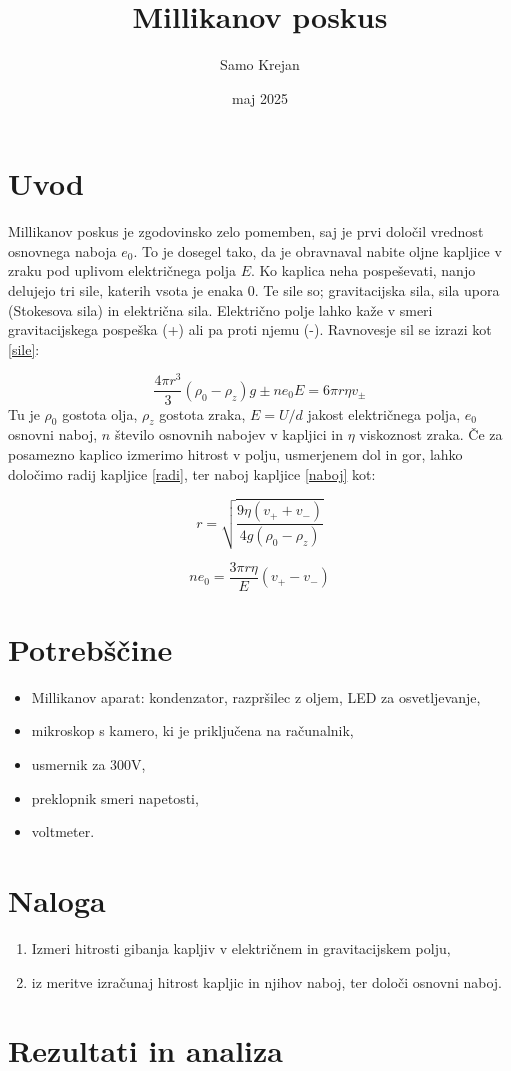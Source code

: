 \documentclass[12pt]{article}
\title{\textbf{Millikanov poskus}}
\author{Samo Krejan}
\date{maj 2025}
\begin{document}
\maketitle

\section{Uvod}

Millikanov poskus je zgodovinsko zelo pomemben, saj je prvi določil vrednost osnovnega naboja $e_0$. To je dosegel tako, da je obravnaval nabite oljne kapljice v zraku pod uplivom električnega polja $E$. Ko kaplica neha pospeševati, nanjo delujejo tri sile, katerih vsota je enaka $0$. Te sile so; gravitacijska sila, sila upora (Stokesova sila) in električna sila. Električno polje lahko kaže v smeri gravitacijskega pospeška (+) ali pa proti njemu (-). Ravnovesje sil se izrazi kot \ref{sile}:

\begin{equation}
    \frac{4\pi r^3}{3} (\rho_0-\rho_z)g \pm n e_0 E = 6\pi r \eta v_\pm
    \label{sile}
\end{equation}
Tu je $\rho_0$ gostota olja, $\rho_z$ gostota zraka, $E = U/d$ jakost električnega polja, $e_0$ osnovni naboj, $n$ število osnovnih nabojev v kapljici in $\eta$ viskoznost zraka. Če za posamezno kaplico izmerimo hitrost v polju, usmerjenem dol in gor, lahko določimo radij kapljice \ref{radi}, ter naboj kapljice \ref{naboj} kot:

\begin{equation}
    r = \sqrt{\frac{9 \eta (v_+ + v_-)}{4g(\rho_0-\rho_z)}}
    \label{radi}
\end{equation}

\begin{equation}
    ne_0 = \frac{3\pi r \eta}{E}(v_+ - v_-)
    \label{naboj}
\end{equation}

\section{Potrebščine}

\begin{itemize}
    \item Millikanov aparat: kondenzator, razpršilec z oljem, LED za osvetljevanje,
    \item mikroskop s kamero, ki je priključena na računalnik,
    \item usmernik za 300V,
    \item preklopnik smeri napetosti,
    \item voltmeter.
\end{itemize}


\section{Naloga}

\begin{enumerate}
    \item Izmeri hitrosti gibanja kapljiv v električnem in gravitacijskem polju,
    \item iz meritve izračunaj hitrost kapljic in njihov naboj, ter določi osnovni naboj.
\end{enumerate}


\section{Rezultati in analiza}
\end{document}
